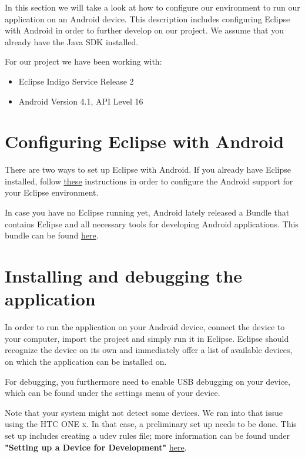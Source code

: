 
In this section we will take a look at how to configure
our environment to run our application on an Android device. 
This description includes configuring Eclipse with Android in order to further develop on our 
project. We assume that you already have the Java SDK installed.

For our project we have been working with:
\begin{itemize}
\item Eclipse Indigo Service Release 2
\item Android Version 4.1, API Level 16
\end{itemize}

\section{Configuring Eclipse with Android}
There are two ways to set up Eclipse with Android.
If you already have Eclipse installed, follow
\href{http://developer.android.com/sdk/installing/installing-adt.html}{these}
instructions in order to configure the Android support for your Eclipse environment.

In case you have no Eclipse running yet, Android
lately released a Bundle that contains Eclipse and all 
necessary tools for developing Android applications.
This bundle can be found \href{http://developer.android.com/sdk/index.html}{here}.

\section{Installing and debugging the application}
In order to run the application on your Android device, connect the device
to your computer, import the project and simply run it in Eclipse. 
Eclipse should recognize the device on its own and immediately offer a list
of available devices, on which the application can be installed on.

For debugging, you furthermore need to enable USB debugging on your device,
which can be found under the settings menu of your device.

Note that your system might not detect some devices. We ran into that issue
using the HTC ONE x. In that case, a preliminary set up needs to be done.
This set up includes creating a udev rules file; more information
can be found under \textbf{"Setting up a Device for Development"} 
\href{http://developer.android.com/tools/device.html#setting-up}{here}.



